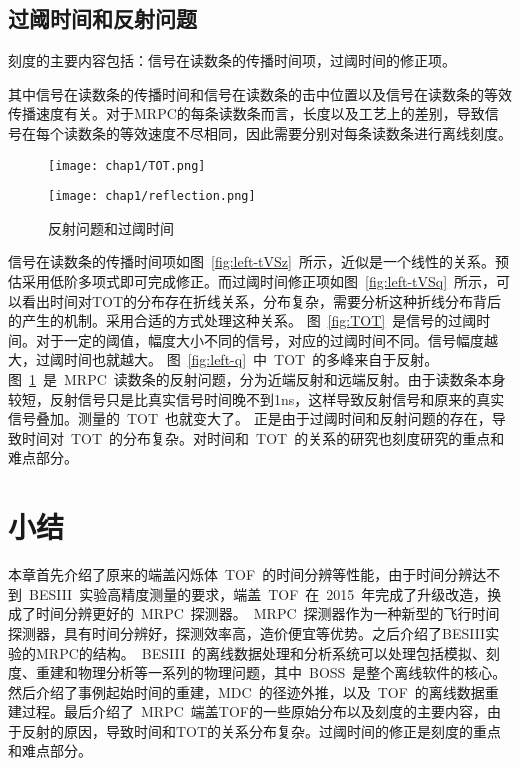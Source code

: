 \subsection{过阈时间和反射问题}
刻度的主要内容包括：信号在读数条的传播时间项，过阈时间的修正项。

其中信号在读数条的传播时间和信号在读数条的击中位置以及信号在读数条的等效传播速度有关。对于MRPC的每条读数条而言，长度以及工艺上的差别，导致信号在每个读数条的等效速度不尽相同，因此需要分别对每条读数条进行离线刻度。

\begin{figure}[!h]
\begin{minipage}[!h]{0.5\linewidth}
\texttt{[image: chap1/TOT.png]}
\label{fig:TOT}
\end{minipage}
\hfill
\begin{minipage}[!h]{0.5\linewidth}
\texttt{[image: chap1/reflection.png]}
\label{fig:reflection}
\end{minipage}%
\caption{反射问题和过阈时间}
\end{figure}
信号在读数条的传播时间项如图~\ref{fig:left-tVSz}~所示，近似是一个线性的关系。预估采用低阶多项式即可完成修正。而过阈时间修正项如图~\ref{fig:left-tVSq}~所示，可以看出时间对TOT的分布存在折线关系，分布复杂，需要分析这种折线分布背后的产生的机制。采用合适的方式处理这种关系。
图~\ref{fig:TOT}~是信号的过阈时间。对于一定的阈值，幅度大小不同的信号，对应的过阈时间不同。信号幅度越大，过阈时间也就越大。
图~\ref{fig:left-q}~中~TOT~的多峰来自于反射。
图~\ref{fig:reflection}~是~MRPC~读数条的反射问题，分为近端反射和远端反射。由于读数条本身较短，反射信号只是比真实信号时间晚不到1ns，这样导致反射信号和原来的真实信号叠加。测量的~TOT~也就变大了。
正是由于过阈时间和反射问题的存在，导致时间对~TOT~的分布复杂。对时间和~TOT~的关系的研究也刻度研究的重点和难点部分。

\section{小结}
本章首先介绍了原来的端盖闪烁体~TOF~的时间分辨等性能，由于时间分辨达不到~BESIII~实验高精度测量的要求，端盖~TOF~在~2015~年完成了升级改造，换成了时间分辨更好的~MRPC~探测器。~MRPC~探测器作为一种新型的飞行时间探测器，具有时间分辨好，探测效率高，造价便宜等优势。之后介绍了BESIII实验的MRPC的结构。~BESIII~的离线数据处理和分析系统可以处理包括模拟、刻度、重建和物理分析等一系列的物理问题，其中~BOSS~是整个离线软件的核心。然后介绍了事例起始时间的重建，MDC~的径迹外推，以及~TOF~的离线数据重建过程。最后介绍了~MRPC~端盖TOF的一些原始分布以及刻度的主要内容，由于反射的原因，导致时间和TOT的关系分布复杂。过阈时间的修正是刻度的重点和难点部分。







